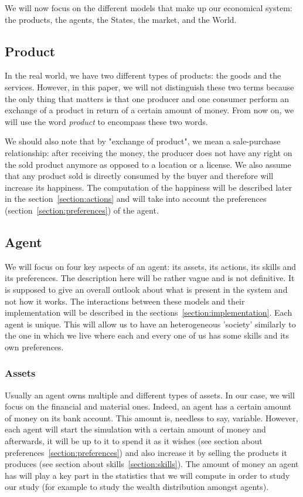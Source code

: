 We will now focus on the different models that make up our economical system: the products, the agents, the States, the market, and the World.

\subsection{Product}\label{section:product}
In the real world, we have two different types of products: the goods and the services. However, in this paper, we will not distinguish these two terms because the only thing that matters is that one producer and one consumer perform an exchange of a product in return of a certain amount of money. From now on, we will use the word \emph{product} to encompass these two words.

We should also note that by "exchange of product", we mean a sale-purchase relationship: after receiving the money, the producer does not have any right on the sold product anymore as opposed to a location or a license. We also assume that any product sold is directly consumed by the buyer and therefore will increase its happiness. The computation of the happiness will be described later in the section~\ref{section:actions} and will take into account the preferences (section~\ref{section:preferences}) of the agent.

\subsection{Agent}\label{section:agent}
We will focus on four key aspects of an agent: its assets, its actions, its skills and its preferences. The description here will be rather vague and is not definitive. It is supposed to give an overall outlook about what is present in the system and not how it works. The interactions between these models and their implementation will be described in the sections~\ref{section:implementation}. Each agent is unique. This will allow us to have an heterogeneous 'society' similarly to the one in which we live where each and every one of us has some skills and its own preferences.

\subsubsection{Assets}\label{section:assets}
Usually an agent owns multiple and different types of assets. In our case, we will focus on the financial and material ones. Indeed, an agent has a certain amount of money on its bank account. This amount is, needless to say, variable. 
However, each agent will start the simulation with a certain amount of money and afterwards, it will be up to it to spend it as it wishes (see section about preferences~\ref{section:preferences}) and also increase it by selling the products it produces (see section about skills~\ref{section:skills}). 
The amount of money an agent has will play a key part in the statistics that we will compute in order to study our study (for example to study the wealth distribution amongst agents). 

